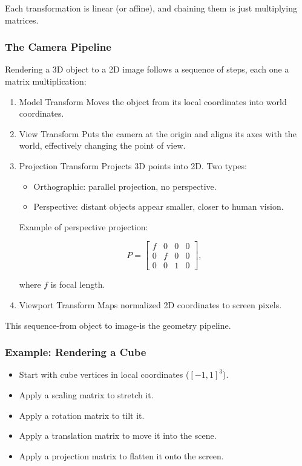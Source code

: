 \documentclass[
  letterpaper,
  DIV=11,
  numbers=noendperiod]{scrreprt}
\providecommand{\tightlist}{%
  \setlength{\itemsep}{0pt}\setlength{\parskip}{0pt}}
\begin{document}
Each transformation is linear (or affine), and chaining them is just
multiplying matrices.

\subsubsection{The Camera Pipeline}\label{the-camera-pipeline}

Rendering a 3D object to a 2D image follows a sequence of steps, each
one a matrix multiplication:

\begin{enumerate}
\def\labelenumi{\arabic{enumi}.}
\item
  Model Transform Moves the object from its local coordinates into world
  coordinates.
\item
  View Transform Puts the camera at the origin and aligns its axes with
  the world, effectively changing the point of view.
\item
  Projection Transform Projects 3D points into 2D. Two types:

  \begin{itemize}
  \tightlist
  \item
    Orthographic: parallel projection, no perspective.
  \item
    Perspective: distant objects appear smaller, closer to human vision.
  \end{itemize}

  Example of perspective projection:

  \[
  P = \begin{bmatrix} 
  f & 0 & 0 & 0 \\ 
  0 & f & 0 & 0 \\ 
  0 & 0 & 1 & 0 
  \end{bmatrix},
  \]

  where \(f\) is focal length.
\item
  Viewport Transform Maps normalized 2D coordinates to screen pixels.
\end{enumerate}

This sequence-from object to image-is the geometry pipeline.

\subsubsection{Example: Rendering a
Cube}\label{example-rendering-a-cube}

\begin{itemize}
\tightlist
\item
  Start with cube vertices in local coordinates (\([-1,1]^3\)).
\item
  Apply a scaling matrix to stretch it.
\item
  Apply a rotation matrix to tilt it.
\item
  Apply a translation matrix to move it into the scene.
\item
  Apply a projection matrix to flatten it onto the screen.
\end{itemize}
\end{document}

